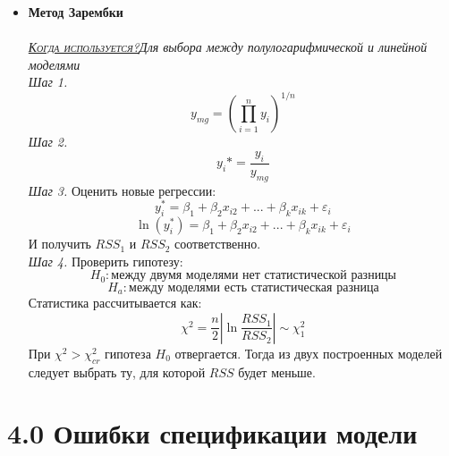 \documentclass[a0,final]{a0poster}
\begin{document}
\begin{multicols}{4}
\begin{itemize}
\item \textbf{Метод Зарембки}\\
\\
\underline{\textsc{\textit{Когда используется?}}}\textit{Для выбора между полулогарифмической и линейной моделями}\\
\textit{Шаг 1.} \[y_{mg} = (\prod\limits_{i=1}^ny_i)^{1/n}\]
\textit{Шаг 2.} \[y_i* = \frac{y_i}{y_{mg}}\]
\textit{Шаг 3.} Оценить новые регрессии: \\
\[y_i^* = \beta_1 + \beta_2x_{i2} + ... + \beta_{k}x_{ik} +\varepsilon_i\]
\[\ln(y_i^*) = \beta_1 + \beta_2x_{i2} + ... + \beta_{k}x_{ik} +\varepsilon_i\]
И получить $RSS_1$ и $RSS_2$ соответственно.\\
\textit{Шаг 4.} Проверить гипотезу:
$$H_0: \text{между двумя моделями нет статистической разницы}$$
$$H_a: \text{между моделями есть статистическая разница} $$
Статистика рассчитывается как:
\[\chi^2 = \frac{n}{2}|\ln\frac{RSS_1}{RSS_2}| \sim \chi^2_1\]
При $\chi^2 > \chi^2_{cr}$ гипотеза $H_0$ отвергается. Тогда из двух построенных моделей следует выбрать ту, для которой $RSS$ будет меньше.
\end{itemize}

\section*{4.0 Ошибки спецификации модели}

\end{multicols}
\end{document}
